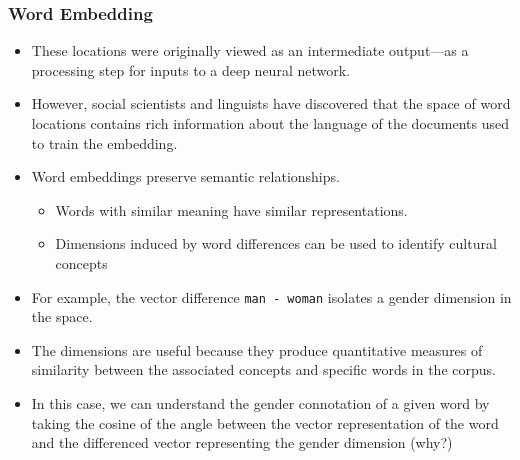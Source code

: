 \documentclass[
  shownotes,
  xcolor={svgnames},
  hyperref={colorlinks,citecolor=DarkBlue,linkcolor=DarkRed,urlcolor=DarkBlue}
  , aspectratio=169]{beamer}
\begin{document}
\begin{frame}
\frametitle{Word Embedding }

\begin{itemize}


 \item These locations were originally viewed as an intermediate output—as a processing step for inputs to a deep neural network.
\item However, social scientists and linguists have discovered that the space of word locations contains rich information about the language of the documents used to train the embedding. 


\item Word embeddings preserve semantic relationships.
  \begin{itemize}
    \item Words with similar meaning have similar representations.
    \item Dimensions induced by word differences can be used to identify cultural concepts 
  \end{itemize}
  \item For example, the vector difference \texttt{man - woman} isolates a gender dimension in the space.
   \item  The dimensions are useful because they produce quantitative measures of similarity between the associated concepts and specific words in the corpus. 
   \item In this case, we can understand the gender connotation of a given word by taking the cosine of the angle between the vector representation of the word and the differenced vector representing the gender dimension (why?)

\end{itemize}

\end{frame}
\end{document}

